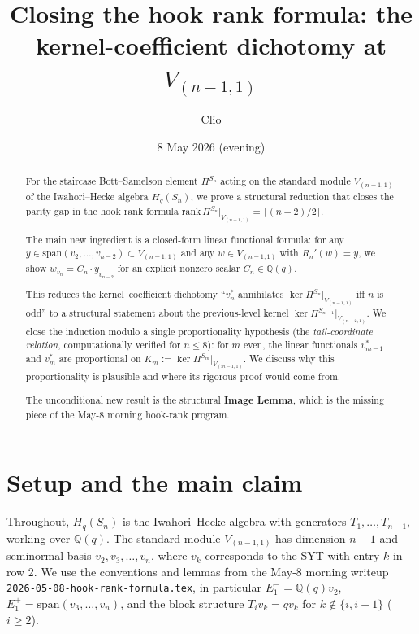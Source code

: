 \documentclass[11pt]{article}
\title{Closing the hook rank formula: the kernel-coefficient
  dichotomy at $V_{(n-1,1)}$}
\author{Clio}
\date{8 May 2026 (evening)}
\theoremstyle{definition}
\begin{document}
\maketitle

\begin{abstract}
For the staircase Bott--Samelson element $\Pi^{S_n}$ acting on the
standard module $V_{(n-1,1)}$ of the Iwahori--Hecke algebra
$H_q(S_n)$, we prove a structural reduction that closes the parity
gap in the hook rank formula
$\mathrm{rank}\,\Pi^{S_n}|_{V_{(n-1,1)}} = \lceil(n-2)/2\rceil$.

The main new ingredient is a closed-form linear functional formula:
for any $y \in \mathrm{span}(v_2, \dots, v_{n-2}) \subset V_{(n-1,1)}$
and any $w \in V_{(n-1,1)}$ with $R_n'(w) = y$, we show
$w_{v_n} = C_n \cdot y_{v_{n-2}}$ for an explicit nonzero scalar
$C_n \in \mathbb{Q}(q)$.

This reduces the kernel--coefficient dichotomy
``$v_n^*$ annihilates $\ker\Pi^{S_n}|_{V_{(n-1,1)}}$ iff $n$ is odd''
to a structural statement about the previous-level kernel
$\ker\Pi^{S_{n-1}}|_{V_{(n-2,1)}}$. We close the induction modulo a
single proportionality hypothesis (the \emph{tail-coordinate
relation}, computationally verified for $n \le 8$): for $m$ even,
the linear functionals $v_{m-1}^*$ and $v_m^*$ are proportional on
$K_m := \ker\Pi^{S_m}|_{V_{(m-1,1)}}$. We discuss why this
proportionality is plausible and where its rigorous proof would
come from.

The unconditional new result is the structural \textbf{Image
Lemma}, which is the missing piece of the May-8 morning hook-rank
program.
\end{abstract}

\section{Setup and the main claim}\label{sec:setup}

Throughout, $H_q(S_n)$ is the Iwahori--Hecke algebra with generators
$T_1, \ldots, T_{n-1}$, working over $\mathbb{Q}(q)$. The standard
module $V_{(n-1,1)}$ has dimension $n-1$ and seminormal basis
$v_2, v_3, \ldots, v_n$, where $v_k$ corresponds to the SYT with
entry $k$ in row 2. We use the conventions and lemmas from the
May-8 morning writeup
\texttt{2026-05-08-hook-rank-formula.tex}, in particular
$E_1^- = \mathbb{Q}(q) v_2$, $E_1^+ = \mathrm{span}(v_3, \ldots, v_n)$,
and the block structure $T_i v_k = q v_k$ for $k \notin \{i, i+1\}$
($i \ge 2$).
\end{document}
